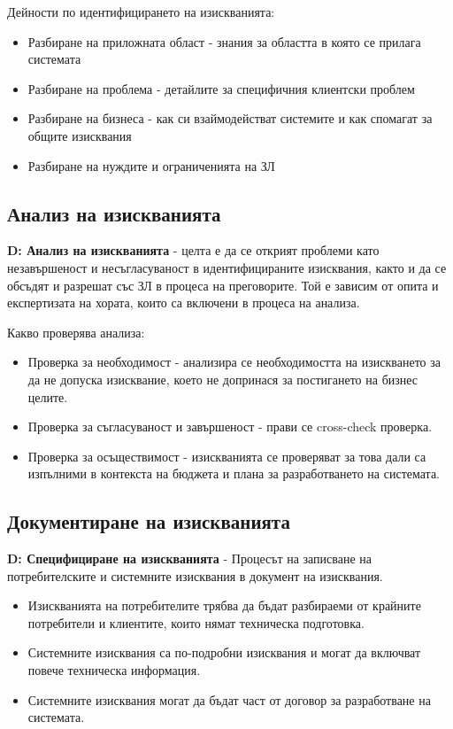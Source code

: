 \documentclass[fleqn,12pt]{article}
\begin{document}
Дейности по идентифицирането на изискванията:
\begin{itemize}
	\item Разбиране на приложната област - знания за областта в която се прилага системата
	\item Разбиране на проблема - детайлите за специфичния клиентски проблем
	\item Разбиране на бизнеса - как си взаймодействат системите и как спомагат за общите изисквания
	\item Разбиране на нуждите и ограниченията на ЗЛ
\end{itemize}


\subsection{Анализ на изискванията}
\textbf{D: Анализ на изискванията} - целта е да се открият проблеми като незавършеност и несъгласуваност в идентифицираните изисквания, както и да се обсъдят и разрешат със ЗЛ в процеса на преговорите. Той е зависим от опита и експертизата на хората, които са включени в процеса на анализа.

Какво проверява анализа:
\begin{itemize}
	\item Проверка за необходимост - анализира се необходимостта на изискването за да не допуска изисквание, което не допринася за постигането на бизнес целите.
	\item Проверка за съгласуваност и завършеност - прави се cross-check проверка.
	\item Проверка за осъществимост - изискванията се проверяват за това дали са изпълними в контекста на бюджета и плана за разработването на системата.
\end{itemize}


\subsection{Документиране на изискванията}
\textbf{D: Специфициране на изискванията} - Процесът на записване на потребителските и системните изисквания в документ на изисквания.
\begin{itemize}
	\item Изискванията на потребителите трябва да бъдат разбираеми от крайните потребители и клиентите, които нямат техническа подготовка.
	\item Системните изисквания са по-подробни изисквания и могат да включват повече техническа информация.
	\item Системните изисквания могат да бъдат част от договор за разработване на системата.
\end{itemize}
\end{document}
